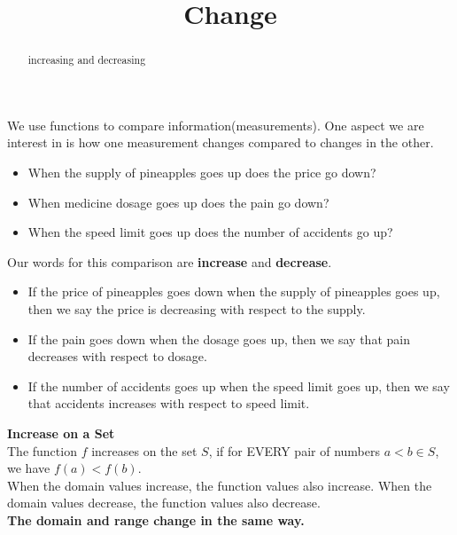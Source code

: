 \documentclass{ximera}
\title{Change}
\begin{document}
\begin{abstract}
increasing and decreasing
\end{abstract}
\maketitle



We use functions to compare information(measurements). One aspect we are interest in is how one measurement changes compared to changes in the other. 


\begin{itemize}
\item When the supply of pineapples goes up does the price go down?
\item When medicine dosage goes up does the pain go down?
\item When the speed limit goes up does the number of accidents go up?
\end{itemize}


Our words for this comparison are \textbf{\textcolor{purple!85!blue}{increase}} and \textbf{\textcolor{purple!85!blue}{decrease}}.


\begin{itemize}
\item If the price of pineapples goes down when the supply of pineapples goes up, then we say the price is decreasing with respect to the supply. \\
\item If the pain goes down when the dosage goes up, then we say that pain decreases with respect to dosage. \\
\item If the number of accidents goes up when the speed limit goes up, then we say that accidents increases with respect to speed limit.
\end{itemize}




\begin{definition} \textbf{\textcolor{green!50!black}{Increase on a Set}} \\

The function $f$ increases on the set $S$, if for EVERY pair of numbers $a < b \in S$, we have  $f(a) < f(b)$. \\

When the domain values increase, the function values also increase.  When the domain values decrease, the function values also decrease.  \\


\textbf{\textcolor{purple!85!blue}{The domain and range change in the same way.}}



\end{definition}
\end{document}
